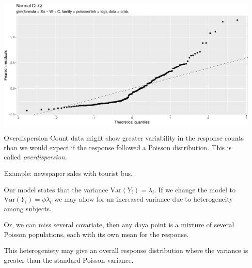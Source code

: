 \documentclass[
  ignorenonframetext,
]{beamer}
\newenvironment{Shaded}{\begin{snugshade}}{\end{snugshade}}
\newcommand{\AttributeTok}[1]{\textcolor[rgb]{0.13,0.29,0.53}{#1}}
\newcommand{\DecValTok}[1]{\textcolor[rgb]{0.00,0.00,0.81}{#1}}
\newcommand{\FunctionTok}[1]{\textcolor[rgb]{0.13,0.29,0.53}{\textbf{#1}}}
\newcommand{\NormalTok}[1]{#1}
\newcommand{\SpecialCharTok}[1]{\textcolor[rgb]{0.81,0.36,0.00}{\textbf{#1}}}
\newcommand{\StringTok}[1]{\textcolor[rgb]{0.31,0.60,0.02}{#1}}
\begin{document}
\begin{frame}[fragile]
\begin{Shaded}
\end{Shaded}

\includegraphics{Module04PoissonGammaPresentationWeek2_files/figure-beamer/unnamed-chunk-7-1.pdf}
\end{frame}

\begin{frame}{Overdispersion}
\protect\hypertarget{overdispersion}{}
Count data might show greater variability in the response counts than we
would expect if the response followed a Poisson distribution. This is
called \emph{overdispersion}.

Example: newspaper sales with tourist bus.

Our model states that the variance \(\text{Var}(Y_i)=\lambda_i\). If we
change the model to \(\text{Var}(Y_i)=\phi\lambda_i\) we may allow for
an increased variance due to heterogeneity among subjects.

Or, we can miss several covariate, then any daya point is a mixture of
several Poisson populations, each with its own mean for the response.

This heterogeniety may give an overall response distribution where the
variance is greater than the standard Poisson variance.
\end{frame}
\end{document}
